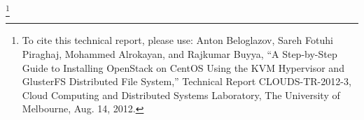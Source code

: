 \thanks{To cite this technical report, please use: Anton Beloglazov, Sareh Fotuhi Piraghaj, Mohammed Alrokayan, and Rajkumar Buyya, ``A Step-by-Step Guide to Installing OpenStack on CentOS Using the KVM Hypervisor and GlusterFS Distributed File System,'' Technical Report CLOUDS-TR-2012-3, Cloud Computing and Distributed Systems Laboratory, The University of Melbourne, Aug. 14, 2012.}
